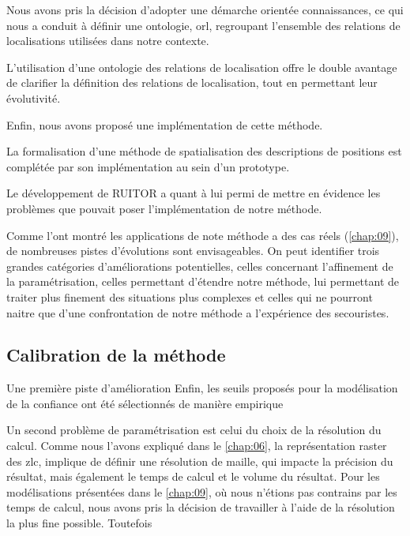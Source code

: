 

Nous avons pris la décision d'adopter une démarche orientée
connaissances, ce qui nous a conduit à définir une ontologie,
\ac{orl}, regroupant l'ensemble des relations de localisations
utilisées dans notre contexte.

L'utilisation d'une ontologie des relations de localisation offre le
double avantage de clarifier la définition des relations de
localisation, tout en permettant leur évolutivité.


Enfin, nous avons proposé une implémentation de cette méthode.

La formalisation d'une méthode de spatialisation des descriptions de
positions est complétée par son implémentation au sein d'un prototype.




Le développement de RUITOR a quant à lui permi de mettre en évidence
les problèmes que pouvait poser l'implémentation de notre méthode.


Comme l'ont montré les applications de note méthode a des cas réels
(\autoref{chap:09}), de nombreuses pistes d'évolutions sont
envisageables. On peut identifier trois grandes catégories
d'améliorations potentielles, celles concernant l'affinement de la
paramétrisation, celles permettant d'étendre notre méthode, lui
permettant de traiter plus finement des situations plus complexes et
celles qui ne pourront naitre que d'une confrontation de notre méthode
a l'expérience des secouristes.

\subsection*{Calibration de la méthode}

Une première piste d'amélioration
Enfin, les seuils proposés pour la modélisation de la confiance ont
été sélectionnés de manière empirique


Un second problème de paramétrisation est celui du choix de la
résolution du calcul. Comme nous l'avons expliqué dans le
\autoref{chap:06}, la représentation raster des \ac{zlc}, implique de
définir une résolution de maille, qui impacte la précision du
résultat, mais également le temps de calcul et le volume du
résultat. Pour les modélisations présentées dans le \autoref{chap:09},
où nous n'étions pas contrains par les temps de calcul, nous avons
pris la décision de travailler à l'aide de la résolution la plus fine
possible. Toutefois


